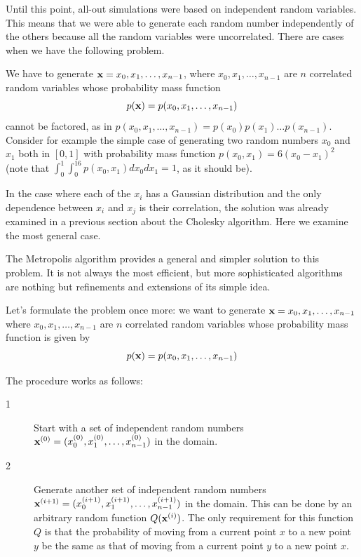 \documentclass[justified,sixbynine]{tufte-book}
\theoremstyle{plain}%
\theoremstyle{definition}
\theoremstyle{remark}
\begin{document}
\begin{fullwidth}
Until this point, all-out simulations were based on independent random
variables. This means that we were able to generate each random number
independently of the others because all the random variables were
uncorrelated. There are cases when we have the following problem.

We have to generate ${\bf x}=x_0,x_1,\dots,x_{n-1}$, where $x_0,x_1,\dots,x_{n-1}$
are $n$ correlated random variables whose probability mass function
\begin{equation}
p({\bf x})=p(x_0,x_1,\dots,x_{n-1})
\end{equation}
cannot be factored, as in $p(x_0,x_1,\dots,x_{n-1})=p(x_0)p(x_1)\dots p(x_{n-1})$. Consider for example the simple case of generating two random numbers $x_0$
and $x_1$ both in $[0,1]$ with probability mass function $%
p(x_0,x_1)=6(x_0-x_1)^2$ (note that $\int_0^1\int_0^16p(x_0,x_1)dx_0dx_1=1$,
as it should be).

In the case where each of the $x_i$ has a Gaussian distribution and the only dependence between $x_i$ and $x_j$ is their correlation, the solution was already examined in a previous section about the Cholesky algorithm. Here we examine the most general case.

The Metropolis algorithm provides a general and simpler solution to this problem. It is not always the most efficient, but more sophisticated algorithms are nothing but refinements and extensions of its simple idea.

Let's formulate the problem once more: we want to generate ${\bf x}%
=x_0,x_1,\dots,x_{n-1}$ where $x_0,x_1,\dots,x_{n-1}$ are $n$ correlated random
variables whose probability mass function is given by
\begin{equation}
p({\bf x})=p(x_0,x_1,\dots,x_{n-1})
\end{equation}

The procedure works as follows:

\begin{description}
\item[1]  Start with a set of independent random numbers ${\bf x}%
^{(0)}=(x_0^{(0)},x_1^{(0)},\dots,x_{n-1}^{(0)})$ in the domain.

\item[2]  Generate another set of independent random numbers ${\bf x}%
^{(i+1)}=(x_0^{(i+1)},x_1^{(i+1)},\dots,x_{n-1}^{(i+1)})$ in the domain. This can be done by an arbitrary random function $Q({\bf x}^{(i)})$. The only requirement for this function $Q$ is that the probability of moving from a current point $x$ to a new point $y$ be the same as that of moving from a current point $y$ to a new point $x$.


\end{description}
\end{fullwidth}
\end{document}
